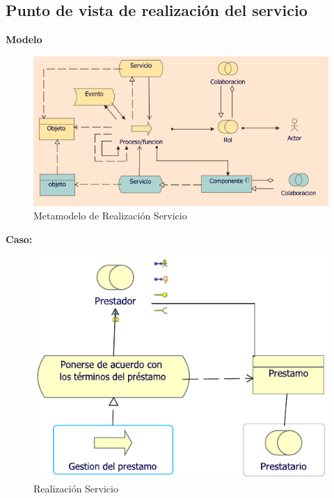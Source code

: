 	\subsection{Punto de vista de realización del servicio}
	{ 		
		\textbf{Modelo}\\
		\begin{figure}[H]
			\centering
			\includegraphics[width=0.8\linewidth]{development/realizacionser.png}
			\caption{Metamodelo de Realización Servicio}
		\end{figure}
		
		\textbf{Caso:}
			
		
		\begin{figure}[H]
			\centering
			\includegraphics[width=0.8\linewidth]{development/realizacionser.pdf}
			\caption{Realización Servicio}
		\end{figure}
	}
	
